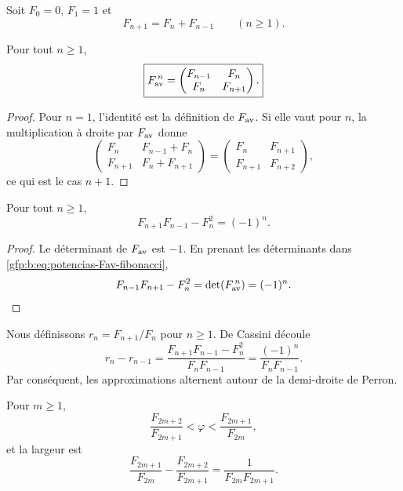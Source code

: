 Soit \(F_0=0\), \(F_1=1\) et
\[
 F_{n+1}=F_n+F_{n-1}\qquad(n\geq1).
\]

\begin{theorem}
\label{gfp:b:thm:potencias-fibonacci-phi}
Pour tout \(n\geq1\),
\begin{equation}
 \boxed{
 F_{\rm av}^{\,n}=
 \begin{pmatrix}
 F_{n-1}&F_n\\
 F_n&F_{n+1}
 \end{pmatrix}.}
 \label{gfp:b:eq:potencias-Fav-fibonacci}
\end{equation}
\end{theorem}

\begin{proof}
Pour \(n=1\), l’identité est la définition de \(F_{\rm av}\). Si elle vaut
pour \(n\), la multiplication à droite par \(F_{\rm av}\) donne
\[
 \begin{pmatrix}
 F_n&F_{n-1}+F_n\\
 F_{n+1}&F_n+F_{n+1}
 \end{pmatrix}
 =
 \begin{pmatrix}
 F_n&F_{n+1}\\
 F_{n+1}&F_{n+2}
 \end{pmatrix},
\]
ce qui est le cas \(n+1\).
\end{proof}

\begin{theorem}
\label{gfp:b:thm:cassini-phi}
Pour tout \(n\geq1\),
\begin{equation}
 \boxed{F_{n+1}F_{n-1}-F_n^2=(-1)^n.}
 \label{gfp:b:eq:cassini-phi}
\end{equation}
\end{theorem}

\begin{proof}
Le déterminant de \(F_{\rm av}\) est \(-1\). En prenant les déterminants dans
\eqref{gfp:b:eq:potencias-Fav-fibonacci},
\[
 F_{n-1}F_{n+1}-F_n^2
 =\det(F_{\rm av}^{\,n})=(-1)^n.
\]
\end{proof}

Nous définissons \(r_n=F_{n+1}/F_n\) pour \(n\geq1\). De Cassini découle
\[
 r_n-r_{n-1}
 =\frac{F_{n+1}F_{n-1}-F_n^2}{F_nF_{n-1}}
 =\frac{(-1)^n}{F_nF_{n-1}}.
\]
Par conséquent, les approximations alternent autour de la demi-droite de Perron.

\begin{proposition}
\label{gfp:b:prop:horquillas-perron-phi}
Pour \(m\geq1\),
\begin{equation}
 \frac{F_{2m+2}}{F_{2m+1}}
 <\varphi<
 \frac{F_{2m+1}}{F_{2m}},
 \label{gfp:b:eq:horquilla-fibonacci-phi}
\end{equation}
et la largeur est
\begin{equation}
 \boxed{
 \frac{F_{2m+1}}{F_{2m}}
 -\frac{F_{2m+2}}{F_{2m+1}}
 =\frac{1}{F_{2m}F_{2m+1}}.}
 \label{gfp:b:eq:anchura-fibonacci-phi}
\end{equation}
\end{proposition}


